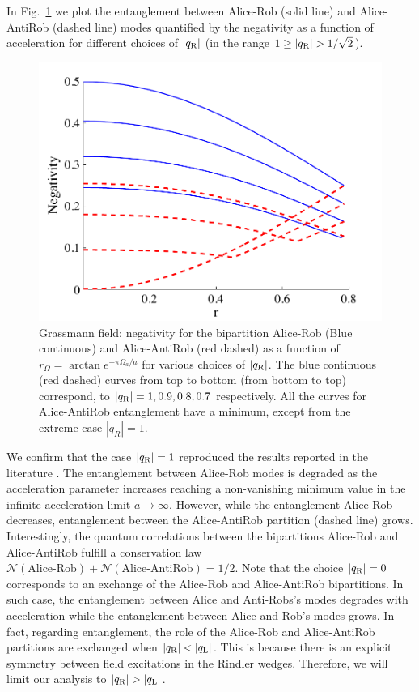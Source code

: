 In Fig.~\ref{bundlefm7} we plot the entanglement between  Alice-Rob (solid line) and Alice-AntiRob (dashed line) modes quantified by the negativity as a function of acceleration for different choices of $|q_\text{\text{R}}|$ (in the range \mbox{$1\ge|q_\text{\text{R}}|>1/\sqrt{2}$}).   
\begin{figure}[h]
\begin{center}
\includegraphics[width=.85\textwidth]{bundle2}
\end{center}
\caption{Grassmann field: negativity for the bipartition Alice-Rob (Blue continuous) and Alice-AntiRob (red dashed) as a function of $r_{\Omega}=\arctan{e^{-\pi\Omega_a/a}}$ for various choices of $|q_\text{\text{R}}|$. The blue continuous (red dashed) curves from top to bottom (from bottom to top) correspond, to $|q_\text{\text{R}}|=1,0.9,0.8,0.7$  respectively. All the curves for Alice-AntiRob entanglement have a minimum, except from the extreme case $|q_R|=1$.}
\label{bundlefm7}
\end{figure}

We confirm that the case $|q_\text{\text{R}}|=1$ reproduced the results reported in the literature \cite{AlsingSchul}. The entanglement between Alice-Rob modes is degraded as the acceleration parameter increases reaching a non-vanishing minimum value in the infinite acceleration limit $a\rightarrow\infty$. However,  while the entanglement Alice-Rob decreases, entanglement between the  Alice-AntiRob partition (dashed line) grows.  Interestingly, the quantum correlations between the bipartitions Alice-Rob and Alice-AntiRob fulfill a conservation law $\mathcal{N}(\text{Alice-Rob})+\mathcal{N}(\text{Alice-AntiRob})=1/2$. 
Note that the choice $|q_\text{\text{R}}|=0$ corresponds to an exchange of the Alice-Rob and Alice-AntiRob bipartitions.  In such case, the entanglement between Alice and Anti-Robs's modes degrades with acceleration while the entanglement between Alice and Rob's modes grows.  In fact, regarding entanglement, the role of the Alice-Rob and Alice-AntiRob partitions are exchanged when $|q_\text{\text{R}}|<|q_\text{\text{L}}|$. This is because there is an explicit symmetry between field excitations in the Rindler wedges.  Therefore, we will limit our analysis to  $|q_\text{\text{R}}|>|q_\text{\text{L}}|$.


